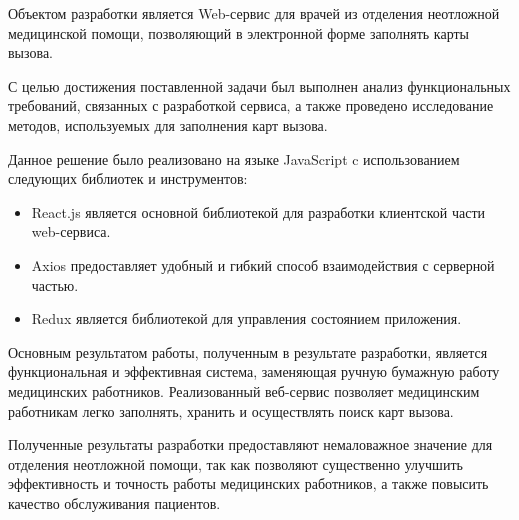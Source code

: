 \abstract %


Объектом разработки является Web-сервис для врачей из отделения неотложной медицинской помощи, позволяющий в электронной форме заполнять карты вызова.

С целью достижения поставленной задачи был выполнен анализ функциональных требований, связанных с разработкой сервиса, а также проведено исследование методов, используемых для заполнения карт вызова.

Данное решение было реализовано на языке JavaScript c использованием следующих библиотек и инструментов: 
\begin{itemize}
\item React.js является основной библиотекой для разработки клиентской части web-сервиса.
\item Axios предоставляет удобный и гибкий способ взаимодействия с серверной частью.
\item Redux является библиотекой для управления состоянием приложения.
\end{itemize}

Основным результатом работы, полученным в результате разработки, является функциональная и эффективная система, заменяющая ручную бумажную работу медицинских работников. Реализованный веб-сервис позволяет медицинским работникам легко заполнять, хранить и  осуществлять поиск карт вызова.

Полученные результаты разработки предоставляют немаловажное значение для отделения неотложной помощи, так как позволяют существенно улучшить эффективность и точность работы медицинских работников, а также повысить качество обслуживания пациентов.